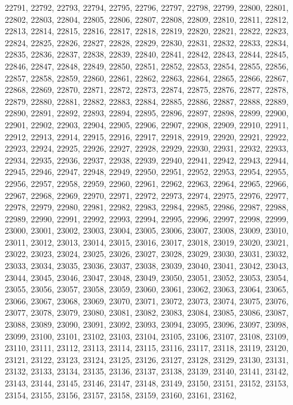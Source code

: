 22791,
22792,
22793,
22794,
22795,
22796,
22797,
22798,
22799,
22800,
22801,
22802,
22803,
22804,
22805,
22806,
22807,
22808,
22809,
22810,
22811,
22812,
22813,
22814,
22815,
22816,
22817,
22818,
22819,
22820,
22821,
22822,
22823,
22824,
22825,
22826,
22827,
22828,
22829,
22830,
22831,
22832,
22833,
22834,
22835,
22836,
22837,
22838,
22839,
22840,
22841,
22842,
22843,
22844,
22845,
22846,
22847,
22848,
22849,
22850,
22851,
22852,
22853,
22854,
22855,
22856,
22857,
22858,
22859,
22860,
22861,
22862,
22863,
22864,
22865,
22866,
22867,
22868,
22869,
22870,
22871,
22872,
22873,
22874,
22875,
22876,
22877,
22878,
22879,
22880,
22881,
22882,
22883,
22884,
22885,
22886,
22887,
22888,
22889,
22890,
22891,
22892,
22893,
22894,
22895,
22896,
22897,
22898,
22899,
22900,
22901,
22902,
22903,
22904,
22905,
22906,
22907,
22908,
22909,
22910,
22911,
22912,
22913,
22914,
22915,
22916,
22917,
22918,
22919,
22920,
22921,
22922,
22923,
22924,
22925,
22926,
22927,
22928,
22929,
22930,
22931,
22932,
22933,
22934,
22935,
22936,
22937,
22938,
22939,
22940,
22941,
22942,
22943,
22944,
22945,
22946,
22947,
22948,
22949,
22950,
22951,
22952,
22953,
22954,
22955,
22956,
22957,
22958,
22959,
22960,
22961,
22962,
22963,
22964,
22965,
22966,
22967,
22968,
22969,
22970,
22971,
22972,
22973,
22974,
22975,
22976,
22977,
22978,
22979,
22980,
22981,
22982,
22983,
22984,
22985,
22986,
22987,
22988,
22989,
22990,
22991,
22992,
22993,
22994,
22995,
22996,
22997,
22998,
22999,
23000,
23001,
23002,
23003,
23004,
23005,
23006,
23007,
23008,
23009,
23010,
23011,
23012,
23013,
23014,
23015,
23016,
23017,
23018,
23019,
23020,
23021,
23022,
23023,
23024,
23025,
23026,
23027,
23028,
23029,
23030,
23031,
23032,
23033,
23034,
23035,
23036,
23037,
23038,
23039,
23040,
23041,
23042,
23043,
23044,
23045,
23046,
23047,
23048,
23049,
23050,
23051,
23052,
23053,
23054,
23055,
23056,
23057,
23058,
23059,
23060,
23061,
23062,
23063,
23064,
23065,
23066,
23067,
23068,
23069,
23070,
23071,
23072,
23073,
23074,
23075,
23076,
23077,
23078,
23079,
23080,
23081,
23082,
23083,
23084,
23085,
23086,
23087,
23088,
23089,
23090,
23091,
23092,
23093,
23094,
23095,
23096,
23097,
23098,
23099,
23100,
23101,
23102,
23103,
23104,
23105,
23106,
23107,
23108,
23109,
23110,
23111,
23112,
23113,
23114,
23115,
23116,
23117,
23118,
23119,
23120,
23121,
23122,
23123,
23124,
23125,
23126,
23127,
23128,
23129,
23130,
23131,
23132,
23133,
23134,
23135,
23136,
23137,
23138,
23139,
23140,
23141,
23142,
23143,
23144,
23145,
23146,
23147,
23148,
23149,
23150,
23151,
23152,
23153,
23154,
23155,
23156,
23157,
23158,
23159,
23160,
23161,
23162,
